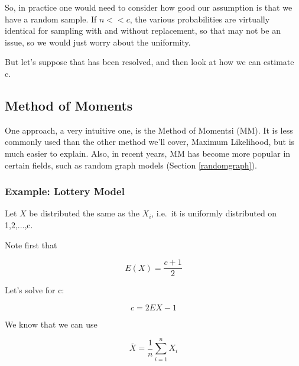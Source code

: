 So, in practice one would need to consider how good our assumption is
that we have a random sample.  If $n << c$, the various probabilities
are virtually identical for sampling with and without replacement, so
that may not be an issue, so we would just worry about the uniformity.

But let's suppose that has been resolved, and then look at how we can
estimate c.

 
\subsection{Method of Moments}
\label{mome}

One approach, a very intuitive one, is the Method of Momentsi (MM).  It
is less commonly used than the other method we'll cover, Maximum
Likelihood, but is much easier to explain.  Also, in recent years, MM
has become more popular in certain fields, such as random graph models
(Section \ref{randomgraph}).

\subsubsection{Example:  Lottery Model}

Let $X$ be distributed the same as the $X_i$, i.e.\ it is uniformly
distributed on 1,2,...,c.

Note first that 

\begin{equation}
\label{exinc}
E(X) = \frac{c+1}{2}
\end{equation}

Let's solve for c:

\begin{equation}
\label{cinex}
c = 2 EX - 1
\end{equation}

We know that we can use

\begin{equation}
\overline{X} = \frac{1}{n} \sum_{i=1}^{n} X_i
\end{equation}

